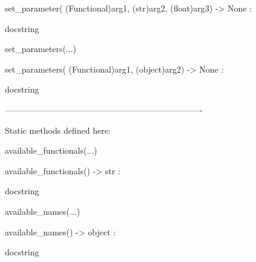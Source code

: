 \documentclass[letterpaper,10pt,english]{sphinxmanual}
\begin{document}
\begin{description}
\begin{description}
\begin{DUlineblock}{0em}
\begin{DUlineblock}{\DUlineblockindent}
\item[] set\_parameter( (Functional)arg1, (str)arg2, (float)arg3) -\textgreater{} None :
\item[]
\begin{DUlineblock}{\DUlineblockindent}
\item[] docstring
\item[] 
\end{DUlineblock}
\end{DUlineblock}
\item[] set\_parameters(...)
\item[]
\begin{DUlineblock}{\DUlineblockindent}
\item[] set\_parameters( (Functional)arg1, (object)arg2) -\textgreater{} None :
\item[]
\begin{DUlineblock}{\DUlineblockindent}
\item[] docstring
\item[] 
\end{DUlineblock}
\end{DUlineblock}
\item[] ----------------------------------------------------------------------
\item[] Static methods defined here:
\item[] 
\item[] available\_functionals(...)
\item[]
\begin{DUlineblock}{\DUlineblockindent}
\item[] available\_functionals() -\textgreater{} str :
\item[]
\begin{DUlineblock}{\DUlineblockindent}
\item[] docstring
\item[] 
\end{DUlineblock}
\end{DUlineblock}
\item[] available\_names(...)
\item[]
\begin{DUlineblock}{\DUlineblockindent}
\item[] available\_names() -\textgreater{} object :
\item[]
\begin{DUlineblock}{\DUlineblockindent}
\item[] docstring
\item[] 
\end{DUlineblock}

\end{DUlineblock}
\end{DUlineblock}
\end{description}
\end{description}
\end{document}
